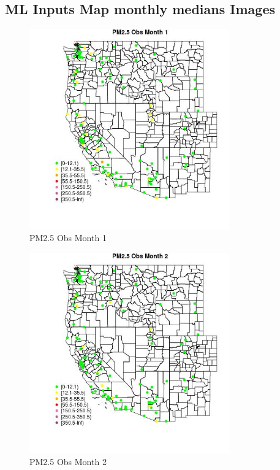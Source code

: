 
\subsection{ML Inputs Map monthly medians Images} 
 

\begin{figure} 
\centering  
\includegraphics[width=0.77\textwidth]{Code_Outputs/Report_ML_input_PM25_Step4_part_e_de_duplicated_aves_MapObsMo1PM25_Obs.jpg} 
\caption{\label{fig:Report_ML_input_PM25_Step4_part_e_de_duplicated_avesMapObsMo1PM25_Obs}PM2.5 Obs Month 1} 
\end{figure} 
 

\begin{figure} 
\centering  
\includegraphics[width=0.77\textwidth]{Code_Outputs/Report_ML_input_PM25_Step4_part_e_de_duplicated_aves_MapObsMo2PM25_Obs.jpg} 
\caption{\label{fig:Report_ML_input_PM25_Step4_part_e_de_duplicated_avesMapObsMo2PM25_Obs}PM2.5 Obs Month 2} 
\end{figure} 
 

